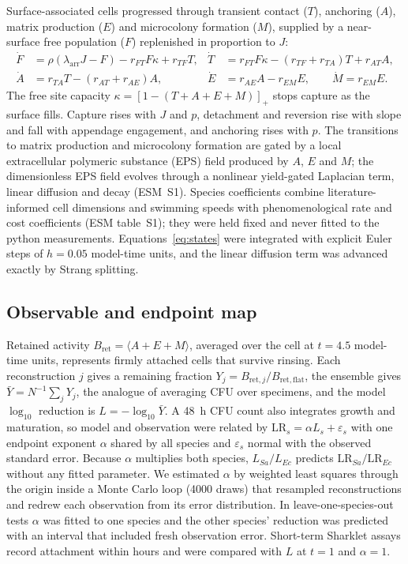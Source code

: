 \documentclass[11pt]{article}
\begin{document}
Surface-associated cells progressed through transient contact ($T$), anchoring ($A$), matrix production ($E$) and microcolony formation ($M$), supplied by a near-surface free population ($F$) replenished in proportion to $J$:
\begin{align}
\dot F&=\rho(\lambda_{\mathrm{arr}}J-F)-r_{FT}F\kappa+r_{TF}T, &\dot T&=r_{FT}F\kappa-(r_{TF}+r_{TA})T+r_{AT}A, \nonumber\\
\dot A&=r_{TA}T-(r_{AT}+r_{AE})A, &\dot E&=r_{AE}A-r_{EM}E,\qquad \dot M=r_{EM}E. \label{eq:states}
\end{align}
The free site capacity $\kappa=[1-(T+A+E+M)]_+$ stops capture as the surface fills. Capture rises with $J$ and $p$, detachment and reversion rise with slope and fall with appendage engagement, and anchoring rises with $p$. The transitions to matrix production and microcolony formation are gated by a local extracellular polymeric substance (EPS) field produced by $A$, $E$ and $M$; the dimensionless EPS field evolves through a nonlinear yield-gated Laplacian term, linear diffusion and decay (ESM~S1). Species coefficients combine literature-informed cell dimensions and swimming speeds with phenomenological rate and cost coefficients (ESM table~S1); they were held fixed and never fitted to the python measurements. Equations~\eqref{eq:states} were integrated with explicit Euler steps of $h=0.05$ model-time units, and the linear diffusion term was advanced exactly by Strang splitting.

\subsection{Observable and endpoint map}
Retained activity $B_{\mathrm{ret}}=\langle A+E+M\rangle$, averaged over the cell at $t=4.5$ model-time units, represents firmly attached cells that survive rinsing. Each reconstruction $j$ gives a remaining fraction $Y_j=B_{\mathrm{ret},j}/B_{\mathrm{ret,flat}}$, the ensemble gives $\bar Y=N^{-1}\sum_jY_j$, the analogue of averaging CFU over specimens, and the model $\log_{10}$ reduction is $L=-\log_{10}\bar Y$. A 48~h CFU count also integrates growth and maturation, so model and observation were related by $\mathrm{LR}_s=\alpha L_s+\varepsilon_s$ with one endpoint exponent $\alpha$ shared by all species and $\varepsilon_s$ normal with the observed standard error. Because $\alpha$ multiplies both species, $L_{Sa}/L_{Ec}$ predicts $\mathrm{LR}_{Sa}/\mathrm{LR}_{Ec}$ without any fitted parameter. We estimated $\alpha$ by weighted least squares through the origin inside a Monte Carlo loop (4000 draws) that resampled reconstructions and redrew each observation from its error distribution. In leave-one-species-out tests $\alpha$ was fitted to one species and the other species' reduction was predicted with an interval that included fresh observation error. Short-term Sharklet assays record attachment within hours and were compared with $L$ at $t=1$ and $\alpha=1$.
\end{document}
